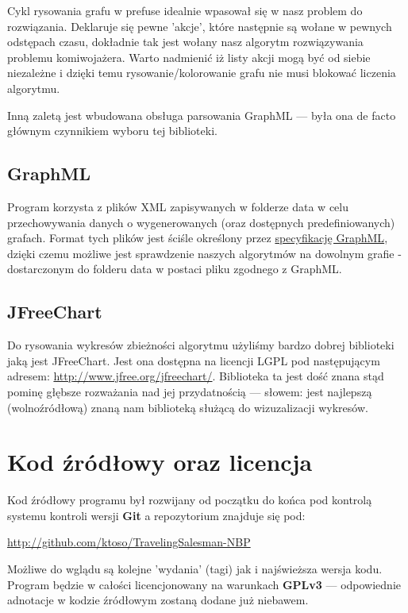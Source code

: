 \documentclass[a4paper]{article}
\begin{document}
Cykl rysowania grafu w prefuse idealnie wpasował się w nasz problem do rozwiązania. Deklaruje się pewne 'akcje', które następnie są wołane w pewnych odstępach czasu, dokładnie tak jest wołany nasz algorytm rozwiązywania problemu komiwojażera. Warto nadmienić iż listy akcji mogą być od siebie niezależne i dzięki temu rysowanie/kolorowanie grafu nie musi blokować liczenia algorytmu. 

Inną zaletą jest wbudowana obsługa parsowania GraphML --- była ona de facto głównym czynnikiem wyboru tej biblioteki.

\subsection{GraphML}
Program korzysta z plików XML zapisywanych w folderze data w celu przechowywania danych o wygenerowanych (oraz dostępnych predefiniowanych) grafach. Format tych plików jest ściśle określony przez \href{http://graphml.graphdrawing.org/specification.html}{specyfikację GraphML}, dzięki czemu możliwe jest sprawdzenie naszych algorytmów na dowolnym grafie - dostarczonym do folderu data w postaci pliku zgodnego z GraphML.

\subsection{JFreeChart}
Do rysowania wykresów zbieżności algorytmu użyliśmy bardzo dobrej biblioteki jaką jest JFreeChart. Jest ona dostępna na licencji LGPL pod następującym adresem: \href{http://www.jfree.org/jfreechart/}{http://www.jfree.org/jfreechart/}. Biblioteka ta jest dość znana stąd pominę głębsze rozważania nad jej przydatnością --- słowem: jest najlepszą (wolnoźródłową) znaną nam biblioteką służącą do wizuzalizacji wykresów.

\section{Kod źródłowy oraz licencja}
Kod źródłowy programu był rozwijany od początku do końca pod kontrolą systemu kontroli wersji \textbf{Git} a repozytorium znajduje się pod:

\begin{flushleft}
\href{http://github.com/ktoso/TravelingSalesman-NBP}{http://github.com/ktoso/TravelingSalesman-NBP}                                                                                                   \end{flushleft}

Możliwe do wglądu są kolejne 'wydania' (tagi) jak i najświeższa wersja kodu. Program będzie w całości licencjonowany na warunkach \textbf{GPLv3} --- odpowiednie adnotacje w kodzie źródłowym zostaną dodane już niebawem.
\end{document}

